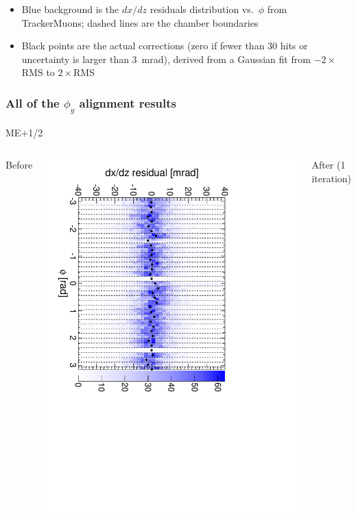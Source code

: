 \documentclass[compress]{beamer}
\begin{document}
\begin{frame}
\begin{itemize}
\item Blue background is the $dx/dz$ residuals distribution
  vs.\ $\phi$ from TrackerMuons; dashed lines are the chamber boundaries
\item Black points are the actual corrections (zero if fewer than 30
  hits or uncertainty is larger than 3~mrad), derived from a Gaussian
  fit from $-2\times$RMS to $2\times$RMS
\end{itemize}
\end{frame}

\begin{frame}
\frametitle{All of the $\phi_y$ alignment results}
\begin{center}
ME$+$1/2
\end{center}

\begin{columns}
\centering Before

\includegraphics[height=\linewidth, angle=90]{iter01_mep12.pdf}

\centering After (1 iteration)


\end{columns}
\end{frame}
\end{document}
